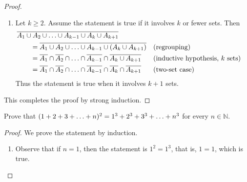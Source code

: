 \documentclass[DIN, pagenumber=false, fontsize=11pt, parskip=half]{scrartcl}
\begin{document}
\begin{problems}
\begin{proof}
\begin{enumerate}
            \item Let $k \geq 2$. Assume the statement is true if it involves $k$ or fewer sets. Then
                \begin{align*}
                    \MoveEqLeft \overline{A_1 \cup A_2 \cup \mathellipsis \cup A_{k-1} \cup A_{k} \cup A_{k+1}}\\
                    & = \overline{A_1 \cup A_2 \cup \mathellipsis \cup A_{k-1} \cup (A_{k} \cup A_{k+1})} && \text{(regrouping)}\\
                    & = \overline{A_1} \cap \overline{A_2} \cap \mathellipsis \cap \overline{A_{k-1}} \cap \overline{A_k \cup A_{k+1}} && \text{(inductive hypothesis, $k$ sets)}\\
                    & = \overline{A_1} \cap \overline{A_2} \cap \mathellipsis \cap \overline{A_{k-1}} \cap \overline{A_{k}} \cap \overline{A_{k+1}} && \text{(two-set case)}
                \end{align*}
                Thus the statement is true when it involves $k+1$ sets.
        \end{enumerate}
        This completes the proof by strong induction.
    \end{proof}

    \problem Prove that $(1+2+3+\mathellipsis+n)^2 = 1^3+2^3+3^3+\mathellipsis+n^3$ for every $n \in \mathbb{N}$.
    \begin{proof}
        We prove the statement by induction.
        \begin{enumerate}
            \item Observe that if $n=1$, then the statement is $1^2 = 1^3$, that is, $1 = 1$, which is true.


\end{enumerate}
\end{proof}
\end{problems}
\end{document}
